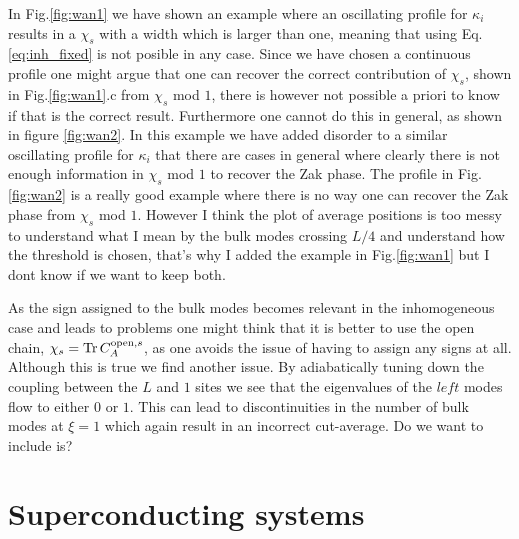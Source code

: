 \documentclass[twocolumn,amsmath,longbibliography,amssymb,superscriptaddress]{revtex4-1}
\newcommand{\carlos}[1]{{\color{red} #1}}
\begin{document}
In Fig.\ref{fig:wan1} we have shown an example where an oscillating profile for $\kappa_i$ results in a $\chi_s$ with a width which is larger than one, meaning that using Eq.\ref{eq:inh_fixed} is not posible in any case. Since we have chosen a continuous profile one might argue that one can recover the correct contribution of $\chi_s$, shown in Fig.\ref{fig:wan1}.c from $\chi_s$ mod $1$, there is however not possible a priori to know if that is the correct result. Furthermore one cannot do this in general, as shown in figure \ref{fig:wan2}. In this example we have added disorder to a similar oscillating profile for $\kappa_i$ that there are cases in general where clearly there is not enough information in $\chi_s$ mod $1$ to recover the Zak phase. \carlos{The profile in Fig.\ref{fig:wan2} is a really good example where there is no way one can recover the Zak phase from $\chi_s$ mod $1$. However I think the plot of average positions is too messy to understand what I mean by the bulk modes crossing $L/4$ and understand how the threshold is chosen, that's why I added the example in Fig.\ref{fig:wan1} but I dont know if we want to keep both.}

As the sign assigned to the bulk modes becomes relevant in the inhomogeneous case and leads to problems one might think that it is better to use the open chain, $\chi_s = \Tr C_A^{{\rm open},s}$, as one avoids the issue of having to assign any signs at all. Although this is true we find another issue. By adiabatically tuning down the coupling between the $L$ and $1$ sites we see that the eigenvalues of the $left$ modes flow to either $0$ or $1$. This can lead to discontinuities in the number of bulk modes at $\xi=1$ which again result in an incorrect cut-average. \carlos{Do we want to include is?}



\section{Superconducting systems}
\end{document}
